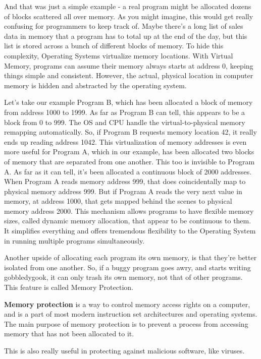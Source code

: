 And that was just a simple example - a real program might be allocated dozens of blocks scattered all over memory. As
you might imagine, this would get really confusing for programmers to keep track of. Maybe there's a long list of
sales data in memory that a program has to total up at the end of the day, but this list is stored across a bunch of
different blocks of memory. To hide this complexity, Operating Systems virtualize memory locations. With Virtual
Memory, programs can assume their memory always starts at address 0, keeping things simple and consistent. However,
the actual, physical location in computer memory is hidden and abstracted by the operating system.

\be
Let's take our example Program B, which has been allocated a block of memory from address 1000 to 1999. As far as
Program B can tell, this appears to be a block from 0 to 999. The OS and CPU handle the virtual-to-physical memory
remapping automatically. So, if Program B requests memory location 42, it really ends up reading address 1042. This
virtualization of memory addresses is even more useful for Program A, which in our example, has been allocated two
blocks of memory that are separated from one another. This too is invisible to Program A. As far as it can tell, it's
been allocated a continuous block of 2000 addresses. When Program A reads memory address 999, that does
coincidentally map to physical memory address 999. But if Program A reads the very next value in memory, at address
1000, that gets mapped behind the scenes to physical memory address 2000. This mechanism allows programs to have
flexible memory sizes, called dynamic memory allocation, that appear to be continuous to them. It simplifies
everything and offers tremendous flexibility to the Operating System in running multiple programs simultaneously.
\ee

Another upside of allocating each program its own memory, is that they're better isolated from one another. So, if a
buggy program goes awry, and starts writing gobbledygook, it can only trash its own memory, not that of other
programs. This feature is called Memory Protection.

\textbf{Memory protection} is a way to control memory access rights on a computer, and is a part of most modern
instruction set architectures and operating systems. The main purpose of memory protection is to prevent a process
from accessing memory that has not been allocated to it.
\ed

This is also really useful in protecting against malicious software, like viruses.

